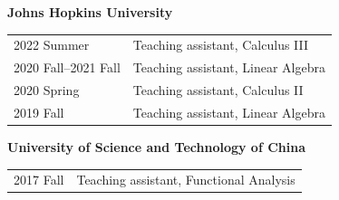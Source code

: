 \documentclass[margin,line,pifont,palatino,courier]{res}
\newenvironment{list1}{
  \begin{list}{\ding{113}}{%
      \setlength{\itemsep}{0in}
      \setlength{\parsep}{0in} \setlength{\parskip}{0in}
      \setlength{\topsep}{0in} \setlength{\partopsep}{0in}
      \setlength{\leftmargin}{0.17in}}}{\end{list}}
\begin{document}
\begin{resume}
{\bf  Johns Hopkins University}

\begin{tabular}{@{}p{1.5in}p{4in}}
2022 Summer & Teaching assistant, Calculus III \\
2020 Fall--2021 Fall & Teaching assistant, Linear Algebra \\
2020 Spring & Teaching assistant, Calculus II  \\
2019 Fall & Teaching assistant, Linear Algebra \\
\end{tabular}

{\bf  University of Science and Technology of China}

\begin{tabular}{@{}p{1.5in}p{4in}}
2017 Fall & Teaching assistant, Functional Analysis\\
\end{tabular}








\end{resume}
\end{document}
